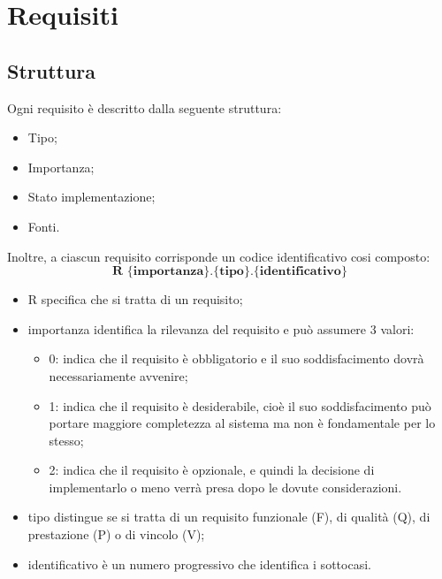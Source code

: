 \section{Requisiti}
\subsection{Struttura}
Ogni requisito è descritto dalla seguente struttura:
\begin{itemize}
	\item Tipo;
	\item Importanza;
	\item Stato implementazione;
	\item Fonti.
\end{itemize}

Inoltre, a ciascun requisito corrisponde un codice identificativo cosi composto:
$$ \textbf{R \{importanza\}.\{tipo\}.\{identificativo\}  } $$
\begin{itemize}
	\item R specifica che si tratta di un requisito;
	\item importanza identifica la rilevanza del requisito e può assumere 3 valori:
	\begin{itemize}
		\item 0: indica che il requisito è obbligatorio e il suo soddisfacimento dovrà necessariamente avvenire;
		\item 1: indica che il requisito è desiderabile, cioè il suo soddisfacimento può portare maggiore completezza al sistema ma non è fondamentale per lo stesso;
		\item 2: indica che il requisito è opzionale, e quindi la decisione di implementarlo o meno verrà presa dopo le dovute considerazioni.
	\end{itemize}
	\item tipo distingue se si tratta di un requisito funzionale (F), di qualità (Q), di prestazione (P) o di vincolo (V);
	\item identificativo è un numero progressivo che identifica i sottocasi.
\end{itemize}

